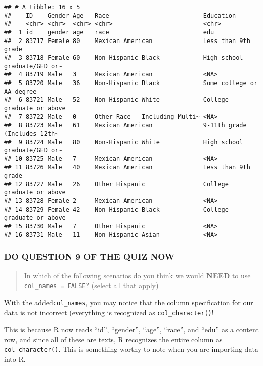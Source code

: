 \documentclass[
]{book}
\begin{document}
\begin{verbatim}
## # A tibble: 16 x 5
##    ID    Gender Age   Race                          Education                   
##    <chr> <chr>  <chr> <chr>                         <chr>                       
##  1 id    gender age   race                          edu                         
##  2 83717 Female 80    Mexican American              Less than 9th grade         
##  3 83718 Female 60    Non-Hispanic Black            High school graduate/GED or~
##  4 83719 Male   3     Mexican American              <NA>                        
##  5 83720 Male   36    Non-Hispanic Black            Some college or AA degree   
##  6 83721 Male   52    Non-Hispanic White            College graduate or above   
##  7 83722 Male   0     Other Race - Including Multi~ <NA>                        
##  8 83723 Male   61    Mexican American              9-11th grade (Includes 12th~
##  9 83724 Male   80    Non-Hispanic White            High school graduate/GED or~
## 10 83725 Male   7     Mexican American              <NA>                        
## 11 83726 Male   40    Mexican American              Less than 9th grade         
## 12 83727 Male   26    Other Hispanic                College graduate or above   
## 13 83728 Female 2     Mexican American              <NA>                        
## 14 83729 Female 42    Non-Hispanic Black            College graduate or above   
## 15 83730 Male   7     Other Hispanic                <NA>                        
## 16 83731 Male   11    Non-Hispanic Asian            <NA>
\end{verbatim}

\hypertarget{do-question-9-of-the-quiz-now-1}{%
\subsubsection{DO QUESTION 9 OF THE QUIZ NOW}\label{do-question-9-of-the-quiz-now-1}}

\begin{quote}
In which of the following scenarios do you think we would \textbf{NEED} to use \texttt{col\_names\ =\ FALSE}? (select all that apply)
\end{quote}

With the added\texttt{col\_names}, you may notice that the column specification for our data is not incorrect (everything is recognized as \texttt{col\_character()}!

This is because R now reads ``id'', ``gender'', ``age'', ``race'', and ``edu'' as a content row, and since all of these are texts, R recognizes the entire column as \texttt{col\_character()}. This is something worthy to note when you are importing data into R.
\end{document}

